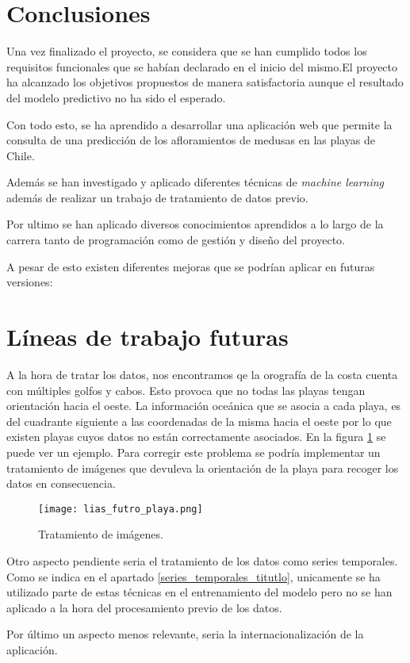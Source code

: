 
\section{Conclusiones}
Una vez finalizado el proyecto, se considera que se han cumplido todos los requisitos funcionales que se habían declarado en el inicio del mismo.El proyecto ha alcanzado los objetivos propuestos de manera satisfactoria aunque el resultado del modelo predictivo no ha sido el esperado.

Con todo esto, se ha aprendido a desarrollar una aplicación web que permite la consulta de una predicción de los afloramientos de medusas en las playas de Chile.

Además se han investigado y aplicado diferentes técnicas de \emph{machine learning} además de realizar un trabajo de tratamiento de datos previo.

Por ultimo se han aplicado diversos conocimientos aprendidos a lo largo de la carrera tanto de programación como de gestión y diseño del proyecto.

A pesar de esto existen diferentes mejoras que se podrían aplicar en futuras versiones:
 
\section{Líneas de trabajo futuras}

A la hora de tratar los datos, nos encontramos qe la orografía de la costa cuenta con múltiples golfos y cabos. Esto provoca que no todas las playas tengan orientación hacia el oeste. La información oceánica que se asocia a cada playa, es del cuadrante siguiente a las coordenadas de la misma hacia el oeste por lo que existen playas cuyos datos no están correctamente asociados. En la figura \ref{tImg} se puede ver un ejemplo. Para corregir este problema se podría implementar un tratamiento de imágenes que devuleva la orientación de la playa para recoger los datos en consecuencia.

\begin{figure}%
	\centering
	\texttt{[image: lias\_futro\_playa.png]}
	\caption[Tratamiento de imágenes]{Tratamiento de imágenes.}\label{tImg}
\end{figure}


Otro aspecto pendiente seria el tratamiento de los datos como series temporales. Como se indica en el apartado \ref{series_temporales_titutlo}, unicamente se ha utilizado parte de estas técnicas en el entrenamiento del modelo pero no se han aplicado a la hora del procesamiento previo de los datos.

Por último un aspecto menos relevante, seria la internacionalización de la aplicación. 